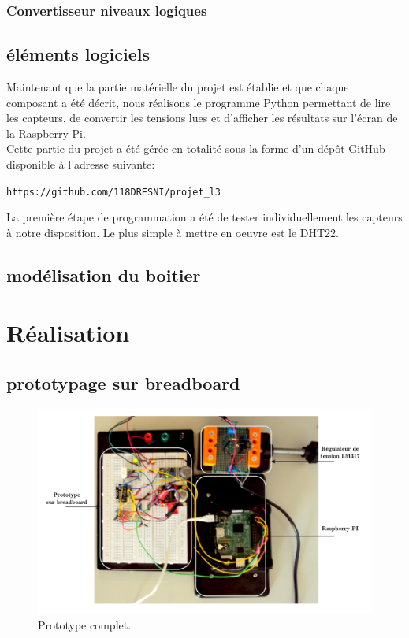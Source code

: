 \documentclass[a4paper]{report}
\begin{document}
\subsubsection{Convertisseur niveaux logiques}


	\subsection{éléments logiciels}
Maintenant que la partie matérielle du projet est établie et que chaque composant a été décrit, nous réalisons le programme Python permettant de lire les capteurs, de convertir les tensions lues et d'afficher les résultats sur l'écran de la Raspberry Pi.\\
Cette partie du projet a été gérée en totalité sous la forme d'un dépôt GitHub disponible à l'adresse suivante:
\begin{center}
	\texttt{https://github.com/118DRESNI/projet\_l3}
\end{center}

La première étape de programmation a été de tester individuellement les capteurs à notre disposition. Le plus simple à mettre en oeuvre est le DHT22.
	\subsection{modélisation du boitier}
	
	\section{Réalisation}
	\subsection{prototypage sur breadboard}

	\begin{figure}[h]	
		\begin{center}			
		\includegraphics[width=1.1\textwidth]{schema_manip}
		\caption{Prototype complet.}
		\label{schema:manip}				
		\end{center}
	\end{figure}
\end{document}
